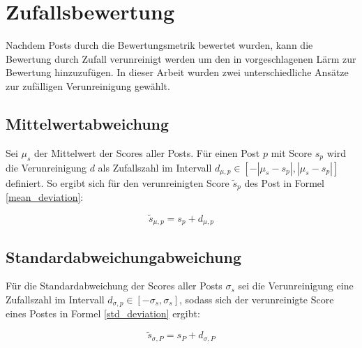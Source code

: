 \section{Zufallsbewertung}

Nachdem Posts durch die Bewertungsmetrik bewertet wurden, kann die Bewertung durch Zufall verunreinigt werden um den in \cite{Luu} vorgeschlagenen Lärm zur Bewertung hinzuzufügen. In dieser Arbeit wurden zwei unterschiedliche Ansätze zur zufälligen Verunreinigung gewählt.

\subsection{Mittelwertabweichung}

Sei $\mu_s$ der Mittelwert der Scores aller Posts. Für einen Post $p$ mit Score $s_p$ wird die Verunreinigung $d$ als Zufallszahl im Intervall $d_{\mu,p} \in [-|\mu_s - s_p|,|\mu_s - s_p|]$ definiert. So ergibt sich für den verunreinigten Score $\tilde{s}_p$ des Post in Formel \ref{mean_deviation}:

\begin{equation}
\label{mean_deviation}
\tilde{s}_{\mu,p} =  s_p + d_{\mu,p}
\end{equation} 

\subsection{Standardabweichungabweichung}

Für die Standardabweichung der Scores aller Posts $\sigma_s$ sei die Verunreinigung eine Zufallszahl im Intervall $d_{\sigma,p} \in [-\sigma_s,\sigma_s]$, sodass sich der verunreinigte Score eines Postes in Formel \ref{std_deviation} ergibt:

\begin{equation}
\label{std_deviation}
\tilde{s}_{\sigma,P} = s_P + d_{\sigma,P}
\end{equation}

	